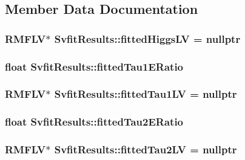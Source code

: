 \subsection{Member Data Documentation}
\hypertarget{classSvfitResults_ad53212bbbb3ed120e696fe36fa4ad215}{
\subsubsection[{fittedHiggsLV}]{\setlength{\rightskip}{0pt plus 5cm}RMFLV$\ast$ {\bf SvfitResults::fittedHiggsLV} = nullptr}}
\label{classSvfitResults_ad53212bbbb3ed120e696fe36fa4ad215}
\hypertarget{classSvfitResults_a061a9d939fb96f6cdfc0688a7b3db356}{
\subsubsection[{fittedTau1ERatio}]{\setlength{\rightskip}{0pt plus 5cm}float {\bf SvfitResults::fittedTau1ERatio}}}
\label{classSvfitResults_a061a9d939fb96f6cdfc0688a7b3db356}
\hypertarget{classSvfitResults_a122d035561c86eff8aa24f84e0c67cb2}{
\subsubsection[{fittedTau1LV}]{\setlength{\rightskip}{0pt plus 5cm}RMFLV$\ast$ {\bf SvfitResults::fittedTau1LV} = nullptr}}
\label{classSvfitResults_a122d035561c86eff8aa24f84e0c67cb2}
\hypertarget{classSvfitResults_a94a0917e8fac0662ad460800b77aa71e}{
\subsubsection[{fittedTau2ERatio}]{\setlength{\rightskip}{0pt plus 5cm}float {\bf SvfitResults::fittedTau2ERatio}}}
\label{classSvfitResults_a94a0917e8fac0662ad460800b77aa71e}
\hypertarget{classSvfitResults_ad1b5371d1ebf4c5cc04c029f280a46cb}{
\subsubsection[{fittedTau2LV}]{\setlength{\rightskip}{0pt plus 5cm}RMFLV$\ast$ {\bf SvfitResults::fittedTau2LV} = nullptr}}
